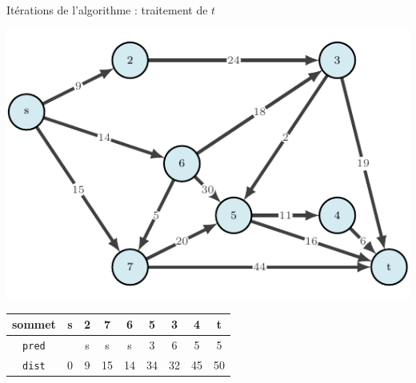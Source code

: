 \begin{frame}{Itérations de l'algorithme : traitement de $t$}
    \begin{center}
        \includegraphics[height=.6\textheight]{fig/ordinal-0.pdf}      
    \begin{tabular}{c|cccccccc}
        
        sommet & s       &2      &7      &6      &5      &3      &4      &t      \\
        \hline
        \texttt{pred} & &s      &s      &s      &3      &6      &5      &5      \\
        \texttt{dist} & 0       &9      &15     &14     &34     &32     &45     &50     \\
    \end{tabular}
\end{center}
\end{frame}